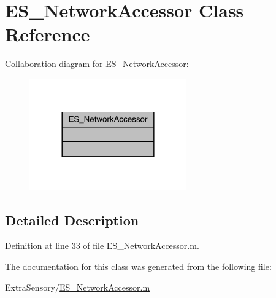 \hypertarget{class_e_s___network_accessor}{\section{E\+S\+\_\+\+Network\+Accessor Class Reference}
\label{class_e_s___network_accessor}
}


Collaboration diagram for E\+S\+\_\+\+Network\+Accessor\+:\nopagebreak
\begin{figure}[H]
\begin{center}
\leavevmode
\includegraphics[width=192pt]{dc/d45/class_e_s___network_accessor__coll__graph}
\end{center}
\end{figure}


\subsection{Detailed Description}


Definition at line 33 of file E\+S\+\_\+\+Network\+Accessor.\+m.



The documentation for this class was generated from the following file\+:\begin{DoxyCompactItemize}
\item 
Extra\+Sensory/\hyperlink{_e_s___network_accessor_8m}{E\+S\+\_\+\+Network\+Accessor.\+m}\end{DoxyCompactItemize}
